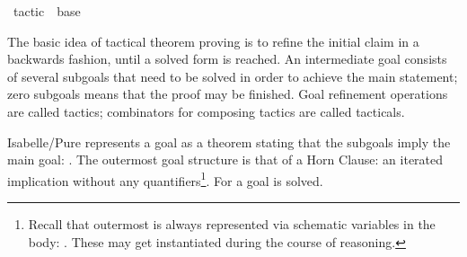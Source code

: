 %
\begin{isabellebody}%
\def\isabellecontext{tactic}%
%
\isadelimtheory
\isanewline
\isanewline
\isanewline
%
\endisadelimtheory
%
\isatagtheory
{}\isamarkupfalse%
\ tactic\ \ base\ %
\endisatagtheory
{\isafoldtheory}%
%
\isadelimtheory
%
\endisadelimtheory
%
\isamarkuptrue%
%
\begin{isamarkuptext}%
The basic idea of tactical theorem proving is to refine the
initial claim in a backwards fashion, until a solved form is reached.
An intermediate goal consists of several subgoals that need to be
solved in order to achieve the main statement; zero subgoals means
that the proof may be finished.  Goal refinement operations are called
tactics; combinators for composing tactics are called tacticals.%
\end{isamarkuptext}%
\isamarkuptrue%
%
\isamarkuptrue%
%
\begin{isamarkuptext}%
Isabelle/Pure represents a goal as a theorem stating that the subgoals imply the main
goal: .  The outermost goal
structure is that of a Horn Clause: an iterated implication without any
quantifiers\footnote{Recall that outermost  is
always represented via schematic variables in the body: .  These may get instantiated during the course of
reasoning.}.  For  a goal is solved.


\end{isamarkuptext}
\end{isabellebody}

